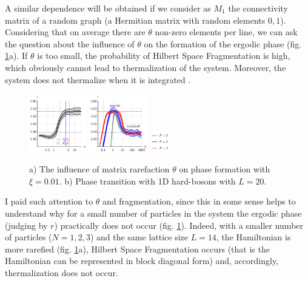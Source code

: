  



A similar dependence will be obtained if we consider as $M_1$ the connectivity matrix of a random graph (a Hermitian matrix with random elements $0,1$).
Considering that on average there are $\theta$ non-zero elements per line, we can ask the question about the influence of $\theta$ on the formation of the ergodic phase (fig. \ref{fig:rtheta}a). If $\theta$ is too small, the probability of Hilbert Space Fragmentation \cite{Moudgalya_2022} is high, which obviously cannot lead to thermalization of the system. Moreover, the system does not thermalize when it is integrated \cite{rigol_thermalization_2008}.


\begin{figure}[h]
    \centering
    \includegraphics[align=c, width=0.225\textwidth]{imgs/ergodic_reg.pdf}
    \hspace{10 mm} 
    \includegraphics[align=c, width=0.225\textwidth]{imgs/transition.pdf}
    \hspace{5 mm} 
    \includegraphics[align=c, width=0.075\textwidth]{imgs/transition_leg.pdf}
    \caption{
        a) The influence of matrix rarefaction $\theta$ on phase formation with $\xi = 0.01$. 
        b) Phase transition with 1D hard-bosons with $L=20$.
        }
    \label{fig:rtheta}
\end{figure}


I paid such attention to $\theta$ and fragmentation, since this in some sense helps to understand why for a small number of particles in the system the ergodic phase (judging by $r$) practically does not occur (fig. \ref{fig:rtheta}). Indeed, with a smaller number of particles ($N=1,2,3$) and the same lattice size $L=14$, the Hamiltonian is more rarefied (fig. \ref{fig:rtheta}a), Hilbert Space Fragmentation occurs (that is the Hamiltonian can be represented in block diagonal form) and, accordingly, thermalization does not occur.


